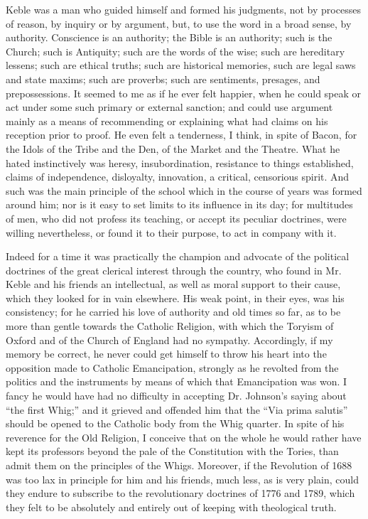 Keble was a man who guided himself and formed his judgments, not by
processes of reason, by inquiry or by argument, but, to use the word in
a broad sense, by authority. Conscience is an authority; the Bible is an
authority; such is the Church; such is Antiquity; such are the words of
the wise; such are hereditary lessens; such are ethical truths; such are
historical memories, such are legal saws and state maxims; such are
proverbs; such are sentiments, presages, and prepossessions. It seemed
to me as if he ever felt happier, when he could speak or act under some
such primary or external sanction; and could use argument mainly as a
means of recommending or explaining what had claims on his reception
prior to proof. He even felt a tenderness, I think, in spite of Bacon,
for the Idols of the Tribe and the Den, of the Market and the Theatre.
What he hated instinctively was heresy, insubordination, resistance to
things established, claims of independence, disloyalty, innovation, a
critical, censorious spirit. And such was the main principle of the
school which in the course of years was formed around him; nor is
it easy to set limits to its influence in its day; for multitudes of
men, who did not profess its teaching, or accept its peculiar doctrines,
were willing nevertheless, or found it to their purpose, to act in
company with it.

Indeed for a time it was practically the champion and advocate of the
political doctrines of the great clerical interest through the country,
who found in Mr. Keble and his friends an intellectual, as well as moral
support to their cause, which they looked for in vain elsewhere. His
weak point, in their eyes, was his consistency; for he carried his love
of authority and old times so far, as to be more than gentle towards the
Catholic Religion, with which the Toryism of Oxford and of the Church of
England had no sympathy. Accordingly, if my memory be correct, he never
could get himself to throw his heart into the opposition made to
Catholic Emancipation, strongly as he revolted from the politics and the
instruments by means of which that Emancipation was won. I fancy he
would have had no difficulty in accepting Dr. Johnson's saying about
``the first Whig;'' and it grieved and offended him that the
``Via prima salutis'' should be opened to the Catholic body from
the Whig quarter. In spite of his reverence for the Old Religion, I
conceive that on the whole he would rather have kept its professors
beyond the pale of the Constitution with the Tories, than admit them on
the principles of the Whigs. Moreover, if the Revolution of 1688 was too
lax in principle for him and his friends, much less, as is very plain,
could they endure to subscribe to the revolutionary doctrines of 1776
and 1789, which they felt to be absolutely and entirely out of keeping
with theological truth.

